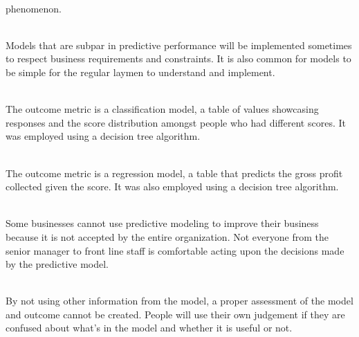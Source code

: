 \documentclass[12pt]{article}
\begin{document}


\begin{enumerate}

\\ phenomenon.

 \\
Models that are subpar in predictive performance will be implemented sometimes to respect business requirements and constraints. It is also common for models to be simple for the regular laymen to understand and implement. 

 \\
The outcome metric is a classification model, a table of values showcasing responses and the score distribution amongst people who had different scores.  It was employed using a decision tree algorithm. 

 \\
The outcome metric is a regression model, a table that predicts the gross profit collected given the score. It was also employed using a decision tree algorithm.

 \\
Some businesses cannot use predictive modeling to improve their business because it is not accepted by the entire organization. Not everyone from the senior manager to front line staff is comfortable acting upon the decisions made by the predictive model. 

 \\
By not using other information from the model, a proper assessment of the model and outcome cannot be created. People will use their own judgement if they are confused about what's in the model and whether it is useful or not.


\end{enumerate}
\end{document}
